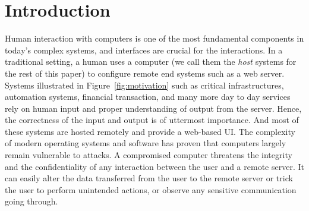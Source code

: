 \section{Introduction}
\label{sec:intro}

Human interaction with computers is one of the most fundamental components in today's complex systems, and interfaces are crucial for the interactions. In a traditional setting, a human uses a computer (we call them the \emph{host} systems for the rest of this paper) to configure remote end systems such as a web server. Systems illustrated in Figure~\ref{fig:motivation} such as critical infrastructures, automation systems, financial transaction, and many more day to day services rely on human input and proper understanding of output from the server. Hence, the correctness of the input and output is of uttermost importance. And most of these systems are hosted remotely and provide a web-based UI. The complexity of modern operating systems and software has proven that computers largely remain vulnerable to attacks. A compromised computer threatens the integrity and the confidentiality of any interaction between the user and a remote server. It can easily alter the data transferred from the user to the remote server or trick the user to perform unintended actions, or observe any sensitive communication going through.


